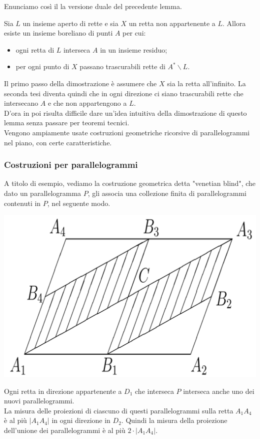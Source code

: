 \documentclass[11pt]{beamer} %
\newcommand{\<}{\langle}
\renewcommand{\>}{\rangle}
\theoremstyle{theorem}
\theoremstyle{theorem}
\theoremstyle{theorem}
\theoremstyle{theorem}
\theoremstyle{theorem}
\begin{document}
\begin{frame}
	Enunciamo così il la versione duale del precedente lemma.
	
	\begin{lemma}
	Sia $L$ un insieme aperto di rette e sia $X$ un retta non appartenente a $L$. Allora esiste un insieme boreliano di punti $A$ per cui:\\
	\begin{itemize}
		\item ogni retta di $L$ interseca $A$ in un insieme residuo;\\
		\item per ogni punto di $X$ passano trascurabili rette di $A^{*} \backslash L$.\\
	\end{itemize}

	\end{lemma}
	\pause
	Il primo passo della dimostrazione è assumere che $X$ sia la retta all'infinito. La seconda tesi diventa quindi che in ogni direzione ci siano trascurabili rette che intersecano $A$ e che non appartengono a $L$.\\
	\pause
	D'ora in poi risulta difficile dare un'idea intuitiva della dimostrazione di questo lemma senza passare per teoremi tecnici.\\
	\pause
	Vengono ampiamente usate costruzioni geometriche ricorsive di parallelogrammi nel piano, con certe caratteristiche.\\
\end{frame}	



\begin{frame}[fragile]
	\frametitle{Costruzioni per parallelogrammi}
		A titolo di esempio, vediamo la costruzione geometrica detta "venetian blind", che dato un parallelogramma $P$, gli associa una collezione finita di parallelogrammi contenuti in $P$, nel seguente modo.
	\pause
	\begin{center}
		\includegraphics[width=0.5\columnwidth]{passo1.png}
	\end{center}
	
	Ogni retta in direzione appartenente a $D_1$ che interseca $P$ interseca anche uno dei nuovi parallelogrammi.\\
	\pause
	La misura delle proiezioni di ciascuno di questi parallelogrammi sulla retta $A_{1} A_{4}$ è al più $\left|A_{1} A_{4}\right|$ in ogni direzione in $D_2$. \pause Quindi la misura della proiezione dell'unione dei parallelogrammi è al più $2 \cdot\left|A_{1} A_{4}\right|$.\\
\end{frame}
\end{document}
